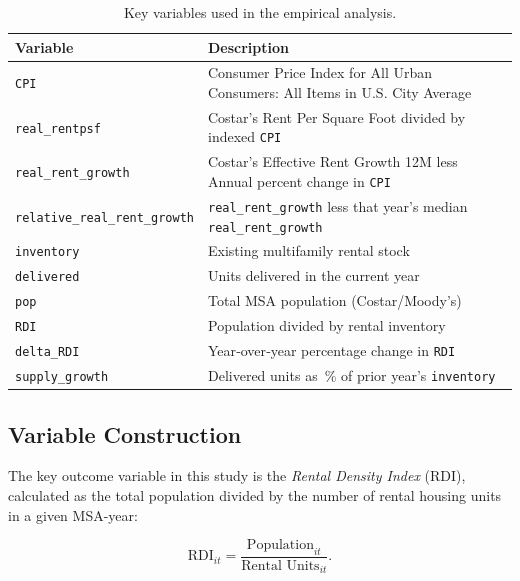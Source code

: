 \documentclass[APA,Times1COL]{WileyNJDv5} %
\begin{document}
\begin{table}[hbt]%
\centering
\caption{Key variables used in the empirical analysis.\label{tab:variables}}%
\begin{tabular*}{\textwidth}{@{\extracolsep\fill}ll@{\extracolsep\fill}}%
\toprule
\textbf{Variable} & \textbf{Description} \\
\midrule
\texttt{CPI}					& Consumer Price Index for All Urban Consumers: All Items in U.S. City Average \\
\texttt{real\_rentpsf}               & Costar's Rent Per Square Foot divided by indexed \texttt{CPI}\\
\texttt{real\_rent\_growth}          & Costar's Effective Rent Growth 12M less Annual percent change in \texttt{CPI} \\
\texttt{relative\_real\_rent\_growth}          & \texttt{real\_rent\_growth} less that year's median \texttt{real\_rent\_growth}\\
\texttt{inventory}             & Existing multifamily rental stock \\
\texttt{delivered}             & Units delivered in the current year \\
\texttt{pop}                   & Total MSA population (Costar/Moody’s) \\
\texttt{RDI}			       & Population divided by rental inventory \\
\texttt{delta\_RDI}	           & Year‐over‐year percentage change in \texttt{RDI} \\
\texttt{supply\_growth}        & Delivered units as \% of prior year's \texttt{inventory}\\
\bottomrule
\end{tabular*}
\end{table}


\subsection{Variable Construction}
The key outcome variable in this study is the \textit{Rental Density Index} (RDI), calculated as the total population divided by the number of rental housing units in a given MSA-year:

\begin{equation*}
	\text{RDI}_{it} = \frac{\text{Population}_{it}}{\text{Rental Units}_{it}}.
\end{equation*}
	
\end{document}
